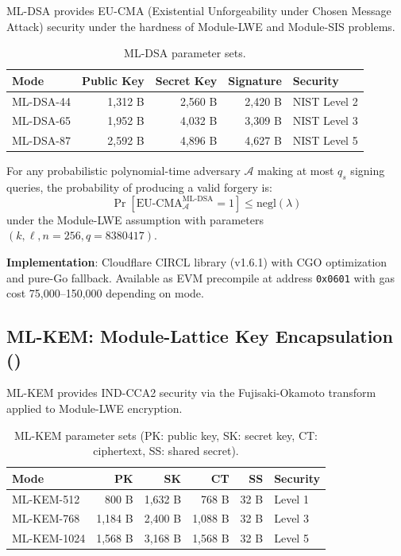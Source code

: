 \documentclass[11pt,letterpaper]{article}
\begin{document}
ML-DSA provides EU-CMA (Existential Unforgeability under Chosen Message Attack) security under the hardness of Module-LWE and Module-SIS problems.

\begin{table}[H]
\centering
\begin{tabular}{@{}lrrrl@{}}
\toprule
\textbf{Mode} & \textbf{Public Key} & \textbf{Secret Key} & \textbf{Signature} & \textbf{Security} \\
\midrule
ML-DSA-44 & 1,312 B & 2,560 B & 2,420 B & NIST Level 2 \\
ML-DSA-65 & 1,952 B & 4,032 B & 3,309 B & NIST Level 3 \\
ML-DSA-87 & 2,592 B & 4,896 B & 4,627 B & NIST Level 5 \\
\bottomrule
\end{tabular}
\caption{ML-DSA parameter sets.}
\label{tab:mldsa-params}
\end{table}

\begin{definition}
For any probabilistic polynomial-time adversary $\mathcal{A}$ making at most $q_s$ signing queries, the probability of producing a valid forgery is:
\[
\Pr[\text{EU-CMA}_{\mathcal{A}}^{\text{ML-DSA}} = 1] \leq \text{negl}(\lambda)
\]
under the Module-LWE assumption with parameters $(k, \ell, n=256, q=8380417)$.
\end{definition}

\textbf{Implementation}: Cloudflare CIRCL library (v1.6.1) with CGO optimization and pure-Go fallback. Available as EVM precompile at address \texttt{0x0601} with gas cost 75,000--150,000 depending on mode.

\subsection{ML-KEM: Module-Lattice Key Encapsulation ()}

ML-KEM provides IND-CCA2 security via the Fujisaki-Okamoto transform applied to Module-LWE encryption.

\begin{table}[H]
\centering
\begin{tabular}{@{}lrrrrl@{}}
\toprule
\textbf{Mode} & \textbf{PK} & \textbf{SK} & \textbf{CT} & \textbf{SS} & \textbf{Security} \\
\midrule
ML-KEM-512 & 800 B & 1,632 B & 768 B & 32 B & Level 1 \\
ML-KEM-768 & 1,184 B & 2,400 B & 1,088 B & 32 B & Level 3 \\
ML-KEM-1024 & 1,568 B & 3,168 B & 1,568 B & 32 B & Level 5 \\
\bottomrule
\end{tabular}
\caption{ML-KEM parameter sets (PK: public key, SK: secret key, CT: ciphertext, SS: shared secret).}
\label{tab:mlkem-params}
\end{table}
\end{document}
